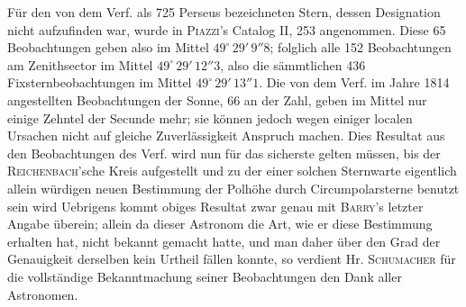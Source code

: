 \noindent{}Für den von dem Verf. als 725 Perseus bezeichneten Stern, dessen Designation nicht aufzufinden war, wurde in \textsc{Piazzi}'s Catalog II, 253 angenommen. Diese 65 Beobachtungen geben also im Mittel $49^\circ\,29'\,9''8$; folglich alle 152 Beobachtungen am Zenithsector im Mittel $49^\circ\,29'\,12''3$, also die sämmtlichen 436 Fixsternbeobachtungen im Mittel $49^\circ\,29'\,13''1$. Die von dem Verf. im Jahre 1814 angestellten Beobachtungen der Sonne, 66 an der Zahl, geben im Mittel nur einige Zehntel der Secunde mehr; sie können jedoch wegen einiger localen Ursachen nicht auf gleiche Zuverlässigkeit Anspruch machen. Dies Resultat aus den Beobachtungen des Verf. wird nun für das sicherste gelten müssen, bis der \textsc{Reichenbach}'sche Kreis aufgestellt und zu der einer solchen Sternwarte eigentlich allein würdigen neuen Bestimmung der Polhöhe durch Circumpolarsterne benutzt sein wird  Uebrigens kommt obiges Resultat zwar genau mit \textsc{Barry}'s letzter Angabe überein; allein da dieser Astronom die Art, wie er diese Bestimmung erhalten hat, nicht bekannt gemacht hatte, und man daher über den Grad der Genauigkeit derselben kein Urtheil fällen konnte, so verdient Hr. \textsc{Schumacher} für die vollständige Bekanntmachung seiner Beobachtungen den Dank aller Astronomen.
